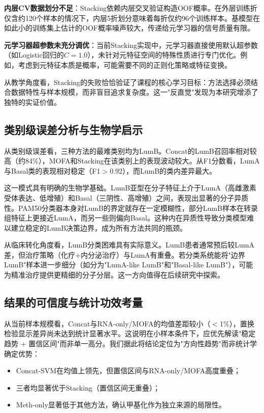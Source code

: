 \textbf{内层CV数据划分不足}：Stacking依赖内层交叉验证构造OOF概率。在外层训练折仅含约120个样本的情况下，内层5折划分意味着每折仅约96个训练样本。基模型在如此小的训练集上估计的OOF概率噪声较大，传递给元学习器的信号质量有限。

\textbf{元学习器超参数未充分调优}：当前Stacking实现中，元学习器直接使用默认超参数（如Logistic回归的$C=1.0$），未针对元特征空间的特殊性质进行专门优化。例如，考虑到元特征本质是概率，可能需要不同的正则化策略或特征变换。

从教学角度看，Stacking的失败恰恰验证了课程的核心学习目标：方法选择必须结合数据特性与样本规模，而非盲目追求复杂度。这一"反直觉"发现为本研究增添了独特的实证价值。

\subsection{类别级误差分析与生物学启示}

从类别级误差看，三种方法的最难类别均为LumB。Concat的LumB召回率相对较高（约84\%），MOFA和Stacking在该类别上的表现波动较大。从F1分数看，LumA与Basal类的表现相对稳定（F1$>$0.92），而LumB的类内差异最大。

这一模式具有明确的生物学基础。LumB亚型在分子特征上介于LumA（高雌激素受体表达、低增殖）和Basal（三阴性、高增殖）之间，表现出显著的分子异质性。PAM50分类器本身对LumB的界定就存在一定模糊性，部分LumB样本在转录组特征上更接近LumA，而另一些则偏向Basal。这种内在异质性导致分类模型难以建立稳定的LumB决策边界，成为所有方法共同的瓶颈。

从临床转化角度看，LumB分类困难具有实际意义。LumB患者通常预后较LumA差，但治疗策略（化疗+内分泌治疗）与LumA有重叠。若分类系统能将"边界LumB"样本进一步细分（如分为"LumA-like LumB"和"Basal-like LumB"），可能为精准治疗提供更精细的分子分层。这一方向值得在后续研究中探索。

\subsection{结果的可信度与统计功效考量}

从当前样本规模看，Concat与RNA-only/MOFA的均值差距较小（$<$1\%），置换检验显示差异尚未达到统计显著水平。这说明在小样本条件下，应优先解读"稳定趋势 + 置信区间"而非单一高分。我们据此将结论定位为"方向性趋势"而非统计学确定优势：

\begin{itemize}
    \item Concat-SVM在均值上领先，但置信区间与RNA-only/MOFA高度重叠；
    \item 三者均显著优于Stacking（置信区间无重叠）；
    \item Meth-only显著低于其他方法，确认甲基化作为独立来源的局限性。
\end{itemize}

